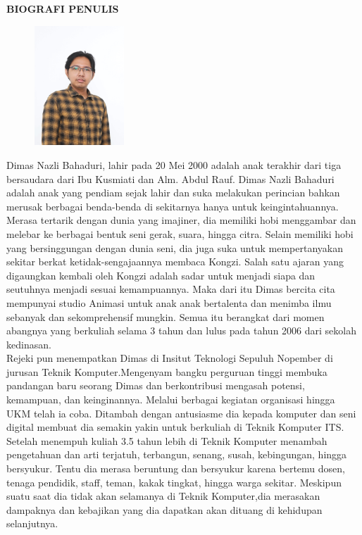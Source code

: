 \begin{center}
  \Large
  \textbf{BIOGRAFI PENULIS}
\end{center}


\vspace{2ex}

\begin{figure}
  \centering
  \vspace{-3ex}
  \includegraphics[width=0.3\textwidth]{gambar/dimas.jpg}
  \vspace{-4ex}
\end{figure}

Dimas Nazli Bahaduri, lahir pada 20 Mei 2000 adalah anak terakhir dari tiga bersaudara dari Ibu Kusmiati dan Alm. Abdul Rauf. Dimas Nazli Bahaduri adalah anak yang pendiam sejak lahir dan suka melakukan perincian bahkan merusak berbagai benda-benda di sekitarnya hanya untuk keingintahuannya. Merasa tertarik dengan dunia yang imajiner, dia memiliki hobi menggambar dan melebar ke berbagai bentuk seni gerak, suara, hingga citra. Selain memiliki hobi yang bersinggungan dengan dunia seni, dia juga suka untuk mempertanyakan  sekitar berkat ketidak-sengajaannya membaca Kongzi. Salah satu ajaran yang digaungkan kembali oleh Kongzi adalah sadar untuk menjadi siapa dan seutuhnya menjadi sesuai kemampuannya. Maka dari itu Dimas bercita cita mempunyai studio Animasi untuk anak anak bertalenta dan menimba ilmu sebanyak dan sekomprehensif mungkin. Semua itu berangkat dari momen abangnya yang berkuliah selama 3 tahun dan lulus pada tahun 2006 dari sekolah kedinasan. 
\\Rejeki pun menempatkan Dimas di Insitut Teknologi Sepuluh Nopember di jurusan Teknik Komputer.Mengenyam bangku perguruan tinggi membuka pandangan baru seorang Dimas dan berkontribusi mengasah potensi, kemampuan, dan keinginannya. Melalui berbagai kegiatan organisasi hingga UKM telah ia coba. Ditambah dengan antusiasme dia kepada komputer dan seni digital membuat dia semakin yakin untuk berkuliah di Teknik Komputer ITS. Setelah menempuh kuliah 3.5 tahun lebih di Teknik Komputer menambah pengetahuan dan arti terjatuh, terbangun, senang, susah, kebingungan, hingga bersyukur. Tentu dia merasa beruntung dan bersyukur karena bertemu dosen, tenaga pendidik, staff, teman, kakak tingkat, hingga warga sekitar. Meskipun suatu saat dia tidak akan selamanya di Teknik Komputer,dia merasakan dampaknya dan kebajikan yang dia dapatkan akan dituang di kehidupan selanjutnya. 

